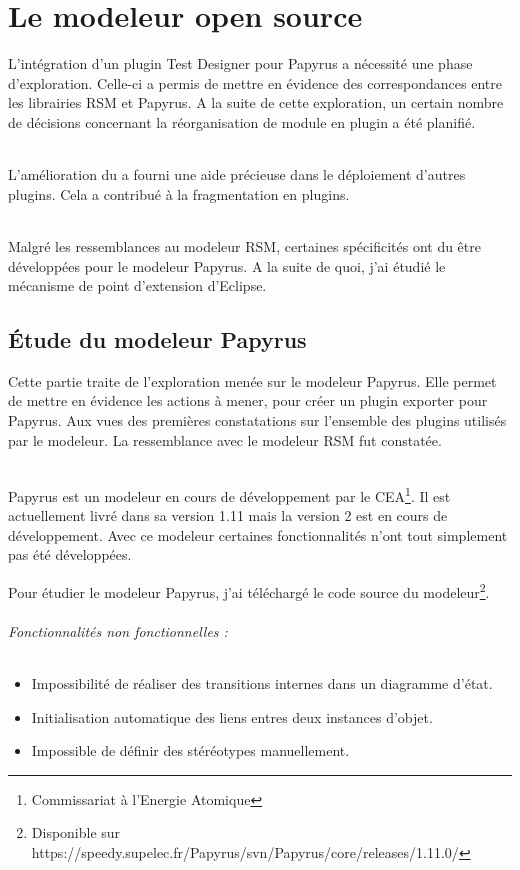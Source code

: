 \chapter{Le modeleur open source}

L'intégration d'un plugin Test Designer pour Papyrus a nécessité une phase d'exploration. Celle-ci a permis de mettre en évidence des correspondances entre les librairies RSM et Papyrus. A la suite de cette exploration, un certain nombre de décisions concernant la réorganisation de module en plugin a été planifié.

\subparagraph*{}
L'amélioration du \build a fourni une aide précieuse dans le déploiement d'autres plugins. 
Cela a contribué à la fragmentation en plugins.

\subparagraph*{}
Malgré les ressemblances au modeleur RSM, certaines spécificités ont du être développées pour le modeleur Papyrus.
A la suite de quoi, j'ai étudié le mécanisme de point d'extension d'Eclipse.

\section{Étude du modeleur Papyrus}

Cette partie traite de l'exploration menée sur le modeleur Papyrus.
Elle permet de mettre en évidence les actions à mener, pour créer un plugin exporter pour Papyrus.
Aux vues des premières constatations sur l'ensemble des plugins utilisés par le modeleur.
La ressemblance avec le modeleur RSM fut constatée.

\subparagraph*{}
Papyrus est un modeleur en cours de développement par le CEA\footnote{Commissariat à l'Energie Atomique}.
Il est actuellement livré dans sa version 1.11 mais la version 2 est en cours de développement.
Avec ce modeleur certaines fonctionnalités n'ont tout simplement pas été développées.

Pour étudier le modeleur Papyrus, j'ai téléchargé le code source du modeleur\footnote{Disponible sur https://speedy.supelec.fr/Papyrus/svn/Papyrus/core/releases/1.11.0/}.

\subparagraph{Fonctionnalités non fonctionnelles : }
\begin{itemize}
  \item Impossibilité de réaliser des transitions internes dans un diagramme d'état.
  \item Initialisation automatique des liens entres deux instances d'objet.
  \item Impossible de définir des stéréotypes manuellement.
\end{itemize}

